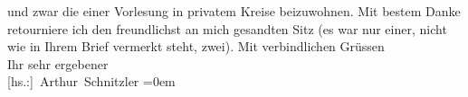 \begin{ledgroupsized}[t]{13cm}
               und zwar die einer Vorlesung in privatem Kreise beizuwohnen.\pend
           \pstart
           {\pb}Mit bestem Danke retourniere ich den freundlichst
               an mich gesandten Sitz (es war nur einer, nicht wie in Ihrem Brief vermerkt steht,
               zwei).\pend
           \pstart
           Mit verbindlichen Grüssen{\\[\baselineskip]}Ihr sehr ergebener{\\[\baselineskip]}\spacefill\mbox{{[}hs.:{]} Arthur Schnitzler}\pend
           \leftskip=0em{}
         
         \endnumbering{}\end{ledgroupsized}  \newcommand{\dateiname}{L02322}\newcommand{\titel}{Arthur Schnitzler an Georg Engländer, 3. 3. 1919}\newcommand{\editorInnen}{Martin Anton Müller und Gerd-Hermann Susen}
      